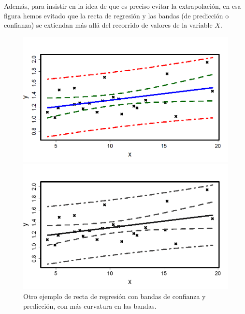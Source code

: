 Además, para insistir en la idea de que es preciso evitar la extrapolación, en esa figura hemos evitado que la recta de regresión y las bandas (de predicción o confianza) se extiendan más allá del recorrido de  valores de la variable $X$.

\begin{figure}[tb]
\begin{center}
\begin{enColor}
\includegraphics[width=14.5cm]{../fig/Cap10-BandasPrediccionConfianza02.png}
\end{enColor}
\begin{bn}
\includegraphics[width=14.5cm]{../fig/Cap10-BandasPrediccionConfianza02-bn.png}
\end{bn}
\end{center}
\caption{Otro ejemplo de recta de regresión con bandas de confianza y predicción, con más curvatura en las bandas.}
\label{tut10:fig:BandasPrediccionConfianza02}
\end{figure}



